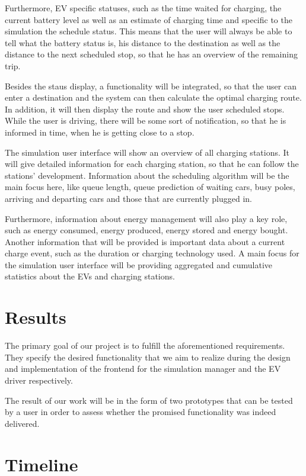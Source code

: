 \documentclass[hidelinks]{sig-alternate}
\begin{document}
Furthermore, EV specific statuses, such as the time waited for charging, the current battery level as well as an
estimate of charging time and specific to the simulation the schedule status. This means that the user will always
be able to tell what the battery status is, his distance to the destination as well as the distance to the next
scheduled stop, so that he has an overview of the remaining trip.

Besides the staus display, a functionality will be integrated, so that the user can enter a destination and the
system can then calculate the optimal charging route. In addition, it will then display the route and show the user
scheduled stops. While the user is driving, there will be some sort of notification, so that he is informed in time,
when he is getting close to a stop.

The simulation user interface will show an overview of all charging stations. It will give detailed information for
each charging station, so that he can follow the stations' development. Information about the scheduling algorithm
will be the main focus here, like queue length, queue prediction of waiting cars, busy poles, arriving and departing
cars and those that are currently plugged in.

Furthermore, information about energy management will also play a key role, such as energy consumed, energy produced,
energy stored and energy bought. Another information that will be provided is important data about a current
charge event, such as the duration or charging technology used. A main focus for the simulation user interface
will be providing aggregated and cumulative statistics about the EVs and charging stations.


\section{Results}

The primary goal of our project is to fulfill the aforementioned requirements. They specify the desired functionality
that we aim to realize during the design and implementation of the frontend for the simulation manager and the EV
driver respectively.

The result of our work will be in the form of two prototypes that can be tested by a user in order to assess whether
the promised functionality was indeed delivered.


\section{Timeline}
\end{document}

